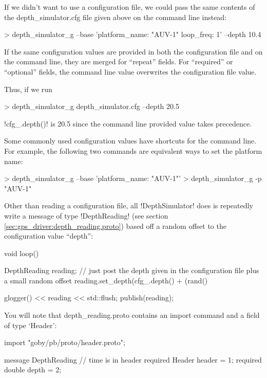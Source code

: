 If we didn't want to use a configuration file, we could pass the same contents of the depth\_simulator.cfg file given above on the command line instead:
\begin{boxedverbatim}
> depth_simulator_g --base 'platform_name: "AUV-1" loop_freq: 1' --depth 10.4
\end{boxedverbatim}
\resetbvlinenumber

If the same configuration values are provided in both the configuration file and on the command line, they are merged for ``repeat'' fields. For ``required'' or ``optional'' fields, the command line value overwrites the configuration file value. 

Thus, if we run
\begin{boxedverbatim}
> depth_simulator_g depth_simulator.cfg --depth 20.5
\end{boxedverbatim}
\resetbvlinenumber
!cfg_.depth()! is 20.5 since the command line provided value takes precedence.

Some commonly used configuration values have shortcuts for the command line. For example, the following two commands are equivalent ways to set the platform name:
\begin{boxedverbatim}
> depth_simulator_g --base 'platform_name: "AUV-1"'
> depth_simulator_g -p "AUV-1"
\end{boxedverbatim}
\resetbvlinenumber

Other than reading a configuration file, all !DepthSimulator! does is repeatedly write a message of type !DepthReading! (see section \ref{sec:gps_driver:depth_reading.proto}) based off a random offset to the configuration value ``depth'':
\begin{boxedverbatim}
void loop()
    {
       DepthReading reading;
       // just post the depth given in the configuration file plus a small random offset
       reading.set_depth(cfg_.depth() + (rand() %

       glogger() << reading << std::flush;
       publish(reading);    
    }
\end{boxedverbatim}
\resetbvlinenumber

You will note that depth\_reading.proto contains an import command and a field of type `Header':
\begin{boxedverbatim}
import "goby/pb/proto/header.proto";

message DepthReading
{
  // time is in header
  required Header header = 1;
  required double depth = 2;
}
\end{boxedverbatim}
\resetbvlinenumber

